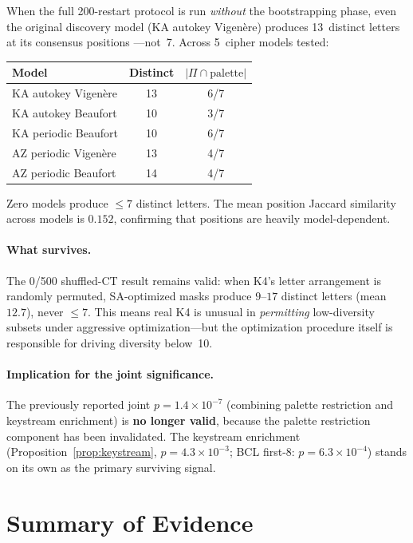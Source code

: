 \documentclass[11pt]{article}
\theoremstyle{remark}
\begin{document}
When the full 200-restart protocol is run \emph{without} the
bootstrapping phase, even the original discovery model (KA autokey
Vigen\`ere) produces 13~distinct letters at its consensus positions
---not~7.  Across 5~cipher models tested:

\begin{center}
\begin{tabular}{lcc}
\toprule
Model & Distinct & $|\Pi \cap \text{palette}|$ \\
\midrule
KA autokey Vigen\`ere & 13 & 6/7 \\
KA autokey Beaufort & 10 & 3/7 \\
KA periodic Beaufort & 10 & 6/7 \\
AZ periodic Vigen\`ere & 13 & 4/7 \\
AZ periodic Beaufort & 14 & 4/7 \\
\bottomrule
\end{tabular}
\end{center}

Zero models produce $\leq 7$ distinct letters.  The mean position
Jaccard similarity across models is $0.152$, confirming that
positions are heavily model-dependent.

\paragraph{What survives.}
The 0/500 shuffled-CT result remains valid: when K4's letter
arrangement is randomly permuted, SA-optimized masks produce
$9$--$17$ distinct letters (mean $12.7$), never $\leq 7$.
This means real K4 is unusual in \emph{permitting} low-diversity
subsets under aggressive optimization---but the optimization
procedure itself is responsible for driving diversity below~10.

\paragraph{Implication for the joint significance.}
The previously reported joint $p = 1.4 \times 10^{-7}$ (combining
palette restriction and keystream enrichment) is \textbf{no longer
valid}, because the palette restriction component has been
invalidated.  The keystream enrichment
(Proposition~\ref{prop:keystream}, $p = 4.3 \times 10^{-3}$;
BCL first-8: $p = 6.3 \times 10^{-4}$) stands on its own as
the primary surviving signal.

\section{Summary of Evidence}
\end{document}
